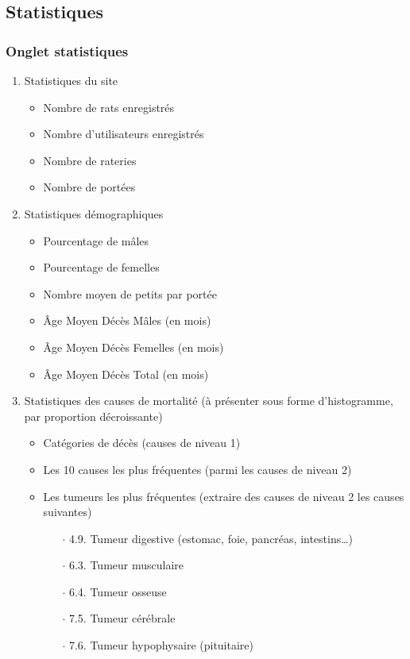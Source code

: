 \documentclass[a4paper,10pt]{article}
\begin{document}
\subsection{Statistiques}
\label{app:stats}

\subsubsection{Onglet statistiques}
 
\begin{enumerate}
\item Statistiques du site
\begin{itemize}
\item Nombre de rats enregistrés
\item Nombre d'utilisateurs enregistrés
\item Nombre de rateries
\item Nombre de portées
\end{itemize}
\item Statistiques démographiques
\begin{itemize}
\item Pourcentage de mâles
\item Pourcentage de femelles
\item Nombre moyen de petits par portée
\item Âge Moyen Décès Mâles (en mois)
\item Âge Moyen Décès Femelles (en mois)
\item Âge Moyen Décès Total (en mois)
\end{itemize}
\item Statistiques des causes de mortalité (à présenter sous forme d'histogramme, par proportion décroissante)
\begin{itemize}
\item Catégories de décès (causes de niveau 1)
\item Les 10 causes les plus fréquentes (parmi les causes de niveau 2)
\item Les tumeurs les plus fréquentes (extraire des causes de niveau 2 les causes suivantes)
 \begin{itemize}
\item[$\cdot$ 4.9.]Tumeur digestive (estomac, foie, pancréas, intestins…)
\item[$\cdot$ 6.3.]Tumeur musculaire
\item[$\cdot$ 6.4.]Tumeur osseuse
\item[$\cdot$ 7.5.]Tumeur cérébrale
\item[$\cdot$ 7.6.]Tumeur hypophysaire (pituitaire)

\end{itemize}
\end{itemize}
\end{enumerate}
\end{document}
